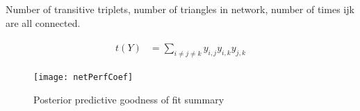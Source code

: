 Number of transitive triplets, number of triangles in network, number of times ijk are all connected.

\begin{align}
\begin{aligned}
t(Y) &= \sum_{i \neq j \neq k} y_{i,j} y_{i,k} y_{j,k}
\end{aligned}
\end{align}

\begin{figure}[ht]
	\centering
	\texttt{[image: netPerfCoef]}
	\caption{Posterior predictive goodness of fit summary}
	\label{fig:ergmAmePerf}
\end{figure}
\FloatBarrier